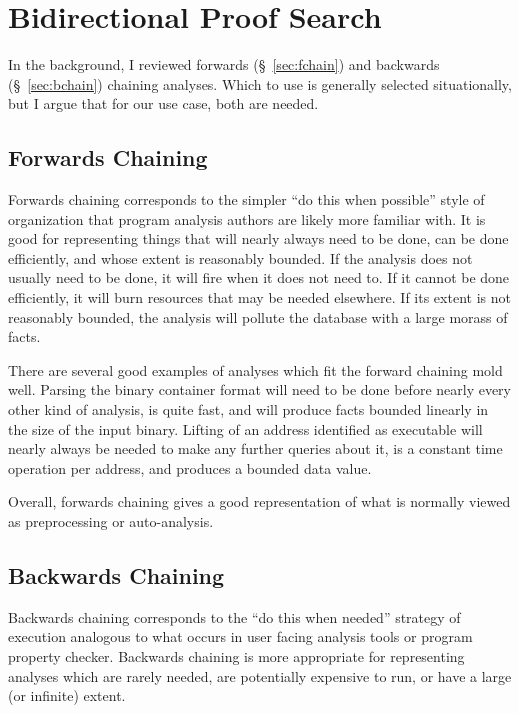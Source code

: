 \section{Bidirectional Proof Search}
\label{sec:bidisearch}
In the background, I reviewed forwards (\S~\ref{sec:fchain}) and backwards (\S~\ref{sec:bchain}) chaining analyses.
Which to use is generally selected situationally, but I argue that for our use case, both are needed.
\subsection{Forwards Chaining}
Forwards chaining corresponds to the simpler ``do this when possible'' style of organization that program analysis authors are likely more familiar with.
It is good for representing things that will nearly always need to be done,
can be done efficiently,
and whose extent is reasonably bounded.
If the analysis does not usually need to be done, it will fire when it does not need to.
If it cannot be done efficiently, it will burn resources that may be needed elsewhere.
If its extent is not reasonably bounded, the analysis will pollute the database with a large morass of facts.

There are several good examples of analyses which fit the forward chaining mold well.
Parsing the binary container format will need to be done before nearly every other kind of analysis, is quite fast, and will produce facts bounded linearly in the size of the input binary.
Lifting of an address identified as executable will nearly always be needed to make any further queries about it, is a constant time operation per address, and produces a bounded data value.

Overall, forwards chaining gives a good representation of what is normally viewed as preprocessing or auto-analysis.

\subsection{Backwards Chaining}
Backwards chaining corresponds to the ``do this when needed'' strategy of execution analogous to what occurs in user facing analysis tools or program property checker.
Backwards chaining is more appropriate for representing analyses which
are rarely needed,
are potentially expensive to run,
or have a large (or infinite) extent.

